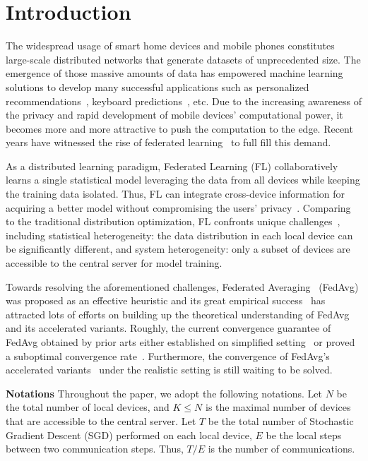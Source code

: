 

\section{Introduction}
The widespread usage of smart home devices and mobile phones constitutes
large-scale distributed networks that generate datasets of unprecedented size.
The emergence of those massive amounts of data has empowered machine learning
solutions to develop many successful applications such as personalized
recommendations~\cite{chen2018federated}, keyboard predictions~\cite{47586},
etc. Due to the increasing awareness of the privacy and rapid development of
mobile devices' computational power, it becomes more and more attractive to
push the computation to the edge. Recent years have witnessed the rise of
federated learning~\cite{mcmahan2016communication} to full fill this demand.

As a distributed learning paradigm, Federated Learning (FL) collaboratively
learns a single statistical model leveraging the data from all devices while
keeping the training data isolated.  Thus, FL can integrate cross-device
information for acquiring a better model  without compromising the users'
privacy~\cite{kairouz2019advances}. Comparing to the traditional distribution optimization,  FL confronts unique
challenges~\cite{li2019convergence,smith2017federated}, including statistical heterogeneity: the data distribution in each local device can be significantly different, and system heterogeneity: only a subset of devices are accessible to the central server for model training. 

Towards resolving the aforementioned challenges, Federated
Averaging~\cite{mcmahan2016communication} (FedAvg) was proposed as an
effective heuristic and its great empirical success~\cite{47586} has attracted
lots of efforts on building up the theoretical understanding of FedAvg
and its accelerated variants. 
Roughly, the current convergence guarantee of FedAvg obtained by prior arts either established on simplified setting~\cite{stich2018local,khaled2019first,wang2018cooperative,yu2019parallel} or proved a suboptimal 
convergence rate~\cite{li2019convergence}. Furthermore, the convergence of
FedAvg's accelerated variants~\cite{yu2019linear,huo2020faster,liu2019accelerating} under the realistic setting is still waiting to be solved.

\textbf{Notations}
Throughout the paper, we adopt the following notations. Let $N$ be the total
number of local devices, and $K \leq N$ is the maximal number of devices
that are accessible to the central server.  Let $T$ be the total number of  Stochastic Gradient Descent (SGD) performed on each local device, $E$ be the local steps between two communication steps. Thus, $T/E$ is
the number of communications.

